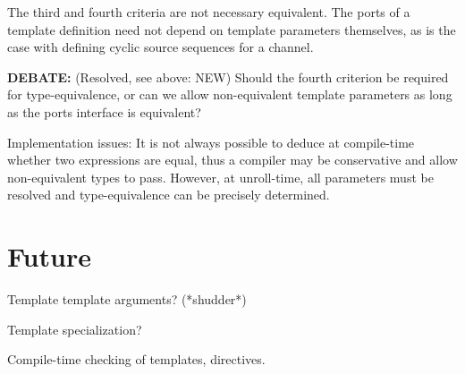 The third and fourth criteria are not necessary equivalent.  
The ports of a template definition need not depend on template
parameters themselves, as is the case with defining 
cyclic source sequences for a channel.  

\textbf{DEBATE:} (Resolved, see above: NEW)
Should the fourth criterion be required for type-equivalence, 
or can we allow non-equivalent template parameters as long as the
ports interface is equivalent?  

Implementation issues:
It is not always possible to deduce at compile-time whether
two expressions are equal, thus a compiler may be conservative
and allow non-equivalent types to pass.  
However, at unroll-time, all parameters must be resolved
and type-equivalence can be precisely determined.  

\section{Future}
\label{sec:templates:future}

Template template arguments?  (*shudder*)

Template specialization?

Compile-time checking of templates, directives.  

